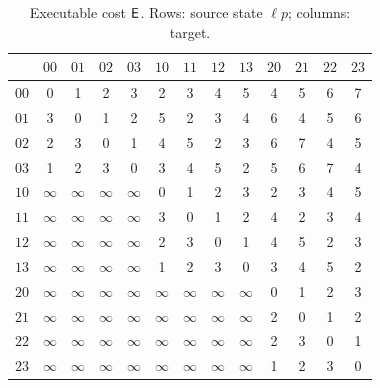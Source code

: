 \begin{table}[h]\centering\scriptsize
\setlength{\tabcolsep}{3pt}
\begin{tabular}{l|cccccccccccc}
 & $00$ & $01$ & $02$ & $03$ & $10$ & $11$ & $12$ & $13$ & $20$ & $21$ & $22$ & $23$ \\ \hline
$00$ & 0 & 1 & 2 & 3 & 2 & 3 & 4 & 5 & 4 & 5 & 6 & 7 \\
$01$ & 3 & 0 & 1 & 2 & 5 & 2 & 3 & 4 & 6 & 4 & 5 & 6 \\
$02$ & 2 & 3 & 0 & 1 & 4 & 5 & 2 & 3 & 6 & 7 & 4 & 5 \\
$03$ & 1 & 2 & 3 & 0 & 3 & 4 & 5 & 2 & 5 & 6 & 7 & 4 \\
$10$ & $\infty$ & $\infty$ & $\infty$ & $\infty$ & 0 & 1 & 2 & 3 & 2 & 3 & 4 & 5 \\
$11$ & $\infty$ & $\infty$ & $\infty$ & $\infty$ & 3 & 0 & 1 & 2 & 4 & 2 & 3 & 4 \\
$12$ & $\infty$ & $\infty$ & $\infty$ & $\infty$ & 2 & 3 & 0 & 1 & 4 & 5 & 2 & 3 \\
$13$ & $\infty$ & $\infty$ & $\infty$ & $\infty$ & 1 & 2 & 3 & 0 & 3 & 4 & 5 & 2 \\
$20$ & $\infty$ & $\infty$ & $\infty$ & $\infty$ & $\infty$ & $\infty$ & $\infty$ & $\infty$ & 0 & 1 & 2 & 3 \\
$21$ & $\infty$ & $\infty$ & $\infty$ & $\infty$ & $\infty$ & $\infty$ & $\infty$ & $\infty$ & 2 & 0 & 1 & 2 \\
$22$ & $\infty$ & $\infty$ & $\infty$ & $\infty$ & $\infty$ & $\infty$ & $\infty$ & $\infty$ & 2 & 3 & 0 & 1 \\
$23$ & $\infty$ & $\infty$ & $\infty$ & $\infty$ & $\infty$ & $\infty$ & $\infty$ & $\infty$ & 1 & 2 & 3 & 0 \\
\end{tabular}
\caption{Executable cost $\mathsf{E}$. Rows: source state $\ell p$; columns: target.}
\end{table}

